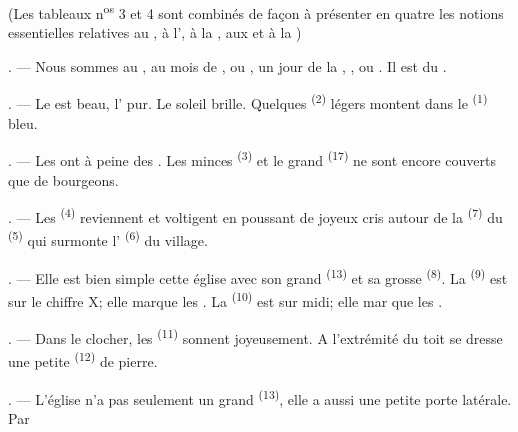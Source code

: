 \begin{VUpage}[19]{}
\VUsaut{3.0mm}
\VUsaut{1.6mm}
\VUsaut{3.4mm}

\VUblancAlinea
(Les tableaux n\textsuperscript{os} 3 et 4 sont combinés de façon à\nl
présenter en quatre  les notions\nl
essentielles relatives au , à l', à la\nl
{}, aux  et à la )

\VUsaut{4.0mm}
\VUsaut{3.0mm}

\VUsaut{3.0mm}

. --- Nous sommes au , au mois de\nl
{},  ou , un jour de la ,\nl
{},  ou . Il est  du\nl
{}.

. --- Le  est beau, l' pur. Le soleil\nl
brille. Quelques  \textsuperscript{(2)} légers montent dans le\nl
{} \textsuperscript{(1)} bleu.

. --- Les  ont à peine des . Les\nl
minces  \textsuperscript{(3)} et le grand  \textsuperscript{(17)} ne sont\nl
encore couverts que de bourgeons.

. --- Les  \textsuperscript{(4)} reviennent et voltigent\nl
en poussant de joyeux cris autour de la  \textsuperscript{(7)} du\nl
{} \textsuperscript{(5)} qui surmonte l' \textsuperscript{(6)} du village.

. --- Elle est bien simple cette église avec son\nl
grand  \textsuperscript{(13)} et sa grosse  \textsuperscript{(8)}. La\nl
{} \textsuperscript{(9)} est sur le chiffre X; elle marque\nl
les . La  \textsuperscript{(10)} est sur midi; elle mar\cc
que les .

. --- Dans le clocher, les  \textsuperscript{(11)} sonnent\nl
joyeusement. A l'extrémité du toit se dresse une\nl
petite  \textsuperscript{(12)} de pierre.

. --- L'église n'a pas seulement un grand \cc
{} \textsuperscript{(13)}, elle a aussi une petite porte latérale. Par
\parplein
\end{VUpage}

